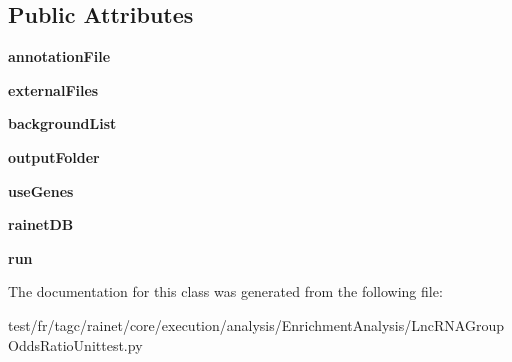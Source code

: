 \subsection*{Public Attributes}
\begin{DoxyCompactItemize}
\item 
\hypertarget{classLncRNAGroupOddsRatioUnittest_1_1LncRNAGroupOddsRatioUnittest_a4d4062f5ebe19a27a13b6677911b7f2e}{{\bfseries annotation\-File}}\label{classLncRNAGroupOddsRatioUnittest_1_1LncRNAGroupOddsRatioUnittest_a4d4062f5ebe19a27a13b6677911b7f2e}

\item 
\hypertarget{classLncRNAGroupOddsRatioUnittest_1_1LncRNAGroupOddsRatioUnittest_ad508e3350bcac8fc78c281978468948a}{{\bfseries external\-Files}}\label{classLncRNAGroupOddsRatioUnittest_1_1LncRNAGroupOddsRatioUnittest_ad508e3350bcac8fc78c281978468948a}

\item 
\hypertarget{classLncRNAGroupOddsRatioUnittest_1_1LncRNAGroupOddsRatioUnittest_a40eef52a7113871a5339b94d65d1ae7f}{{\bfseries background\-List}}\label{classLncRNAGroupOddsRatioUnittest_1_1LncRNAGroupOddsRatioUnittest_a40eef52a7113871a5339b94d65d1ae7f}

\item 
\hypertarget{classLncRNAGroupOddsRatioUnittest_1_1LncRNAGroupOddsRatioUnittest_afe06014218a8078d31d70f870e4faefb}{{\bfseries output\-Folder}}\label{classLncRNAGroupOddsRatioUnittest_1_1LncRNAGroupOddsRatioUnittest_afe06014218a8078d31d70f870e4faefb}

\item 
\hypertarget{classLncRNAGroupOddsRatioUnittest_1_1LncRNAGroupOddsRatioUnittest_a255025df34632596174c0776273e0a02}{{\bfseries use\-Genes}}\label{classLncRNAGroupOddsRatioUnittest_1_1LncRNAGroupOddsRatioUnittest_a255025df34632596174c0776273e0a02}

\item 
\hypertarget{classLncRNAGroupOddsRatioUnittest_1_1LncRNAGroupOddsRatioUnittest_a26a647f97985e4c20009e838cbad0a96}{{\bfseries rainet\-D\-B}}\label{classLncRNAGroupOddsRatioUnittest_1_1LncRNAGroupOddsRatioUnittest_a26a647f97985e4c20009e838cbad0a96}

\item 
\hypertarget{classLncRNAGroupOddsRatioUnittest_1_1LncRNAGroupOddsRatioUnittest_a24b2ff6eb8055b4aff81f0067681e74c}{{\bfseries run}}\label{classLncRNAGroupOddsRatioUnittest_1_1LncRNAGroupOddsRatioUnittest_a24b2ff6eb8055b4aff81f0067681e74c}

\end{DoxyCompactItemize}


The documentation for this class was generated from the following file\-:\begin{DoxyCompactItemize}
\item 
test/fr/tagc/rainet/core/execution/analysis/\-Enrichment\-Analysis/Lnc\-R\-N\-A\-Group\-Odds\-Ratio\-Unittest.\-py\end{DoxyCompactItemize}
